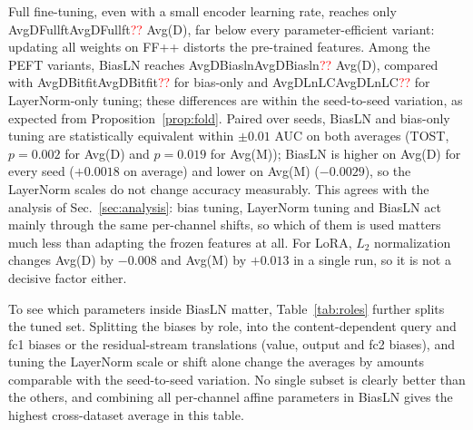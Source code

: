 \documentclass[fonts]{icst}
\newif\ifrevmark\revmarkfalse
\newcommand{\rev}[1]{\ifrevmark{\color{revblue}#1}\else#1\fi}
\newenvironment{revblock}{\ifrevmark\color{revblue}\fi}{}
\newcommand{\num}[1]{\ifcsname #1\endcsname\csname #1\endcsname\else\textcolor{red}{??}\fi}
\begin{document}
\begin{revblock}
Full fine-tuning, even with a small encoder learning rate, reaches only \num{AvgDFullft} Avg(D), far below every parameter-efficient variant: updating all weights on FF++ distorts the pre-trained features. Among the PEFT variants, BiasLN reaches \num{AvgDBiasln} Avg(D), compared with \num{AvgDBitfit} for bias-only and \num{AvgDLnLC} for LayerNorm-only tuning; these differences are within the seed-to-seed variation, as expected from Proposition~\ref{prop:fold}. Paired over seeds, BiasLN and bias-only tuning are statistically equivalent within $\pm0.01$ AUC on both averages (TOST, $p=0.002$ for Avg(D) and $p=0.019$ for Avg(M)); BiasLN is higher on Avg(D) for every seed ($+0.0018$ on average) and lower on Avg(M) ($-0.0029$), so the LayerNorm scales do not change accuracy measurably. This agrees with the analysis of Sec.~\ref{sec:analysis}: bias tuning, LayerNorm tuning and BiasLN act mainly through the same per-channel shifts, so which of them is used matters much less than adapting the frozen features at all. For LoRA, $L_2$ normalization changes Avg(D) by $-0.008$ and Avg(M) by $+0.013$ in a single run, so it is not a decisive factor either.

To see which parameters inside BiasLN matter, Table~\ref{tab:roles} further splits the tuned set. Splitting the biases by role, into the content-dependent query and fc1 biases or the residual-stream translations (value, output and fc2 biases), and tuning the LayerNorm scale or shift alone change the averages by amounts comparable with the seed-to-seed variation. No single subset is clearly better than the others, and combining all per-channel affine parameters in BiasLN gives the highest cross-dataset average in this table.
\end{revblock}

\begin{table}[H]
\centering
\captionsetup{labelsep=period, labelfont=bf, hypcap=false}
\caption{\rev{Which parameters inside BiasLN to tune ($L_2$ normalization, cross-entropy). Only the tuned subset of the encoder differs. Video AUC, mean $\pm$ std over $n$ seeds.}}
\label{tab:roles}
\resizebox{\columnwidth}{!}{}
\end{table}
\end{document}
